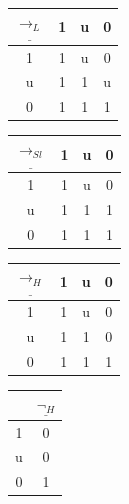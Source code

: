 \documentclass[10pt,a4paper]{article}
\theoremstyle{definition}
\newcommand{\3}{\vspace{.3in}}
\newcommand{\2}{\vspace{.2in}}
\newcommand{\1}{\vspace{.1in}}
\newcommand{\5}{\vspace{.05in}}
\begin{document}
\begin{center}
	\begin{tabular}{|c|ccc|}
		\hline
		$\underline{\rightarrow_L} $ & 1 & u & 0 \\
		\hline
		1 & 1 & u & 0 \\
		u & 1 & 1 & u \\
		0 & 1 & 1 & 1 \\
		\hline
	\end{tabular}
	\begin{tabular}{|c|ccc|}
		\hline $\underline{\rightarrow_{Sl}} $ & 1 & u & 0\\\hline
		1 & 1 & u & 0 \\
		u & 1 & 1 & 1 \\
		0 & 1 & 1 & 1 \\	\hline
	\end{tabular}
	\begin{tabular}{|c|ccc|}
		\hline $\underline{\rightarrow_H} $ & 1 & u & 0\\\hline
		1 & 1 & u & 0 \\
		u & 1 & 1 & 0 \\
		0 & 1 & 1 & 1 \\	\hline
	\end{tabular}
	\begin{tabular}{|c|c|}
		\hline  & $\underline{\neg_H} $\\\hline
		1 & 0\\
		u & 0 \\
		0 & 1 \\\hline
	\end{tabular}
	\end{center} 
\end{document}
